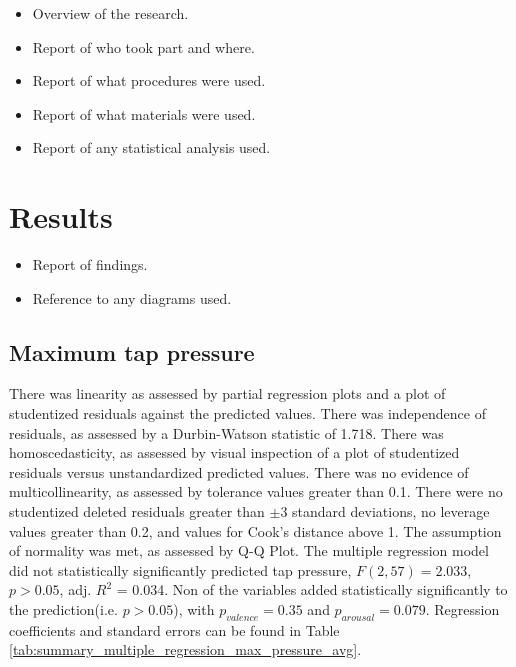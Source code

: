 \documentclass{sig-alternate}
\begin{document}
\begin{itemize}
	\item Overview of the research.
	\item Report of who took part and where.
	\item Report of what procedures were used.
	\item Report of what materials were used.
	\item Report of any statistical analysis used.
\end{itemize}


\section{Results} %
\label{sec:results}
\begin{itemize}
	\item Report of findings.
	\item Reference to any diagrams used.
\end{itemize}

\subsection{Maximum tap pressure}
There was linearity as assessed by partial regression plots and a plot of studentized residuals against the predicted values. There was independence of residuals, as assessed by a Durbin-Watson statistic of 1.718. There was homoscedasticity, as assessed by visual inspection of a plot of studentized residuals versus unstandardized predicted values. There was no evidence of multicollinearity, as assessed by tolerance values greater than 0.1. There were no studentized deleted residuals greater than $\pm$3 standard deviations, no leverage values greater than 0.2, and values for Cook's distance above 1. The assumption of normality was met, as assessed by Q-Q Plot. The multiple regression model did not statistically significantly predicted tap pressure, $F(2, 57) = 2.033$, $p > 0.05$, adj. $R^2$ = 0.034. Non of the variables added statistically significantly to the prediction(i.e. $p > 0.05$), with $p_{valence} = 0.35$ and $p_{arousal} = 0.079$. Regression coefficients and standard errors can be found in Table \ref{tab:summary_multiple_regression_max_pressure_avg}.
\end{document}
